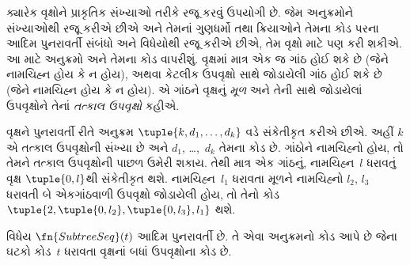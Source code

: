 \documentclass[../../../include/open-logic-section]{subfiles}
\begin{document}

ક્યારેક વૃક્ષોને પ્રાકૃતિક સંખ્યાઓ તરીકે રજૂ કરવું ઉપયોગી છે. જેમ
અનુક્રમોને સંખ્યાઓથી રજૂ કરીએ છીએ અને તેમનાં ગુણધર્મો તથા ક્રિયાઓને
તેમના કોડ પરના આદિમ પુનરાવર્તી સંબંધો અને વિધેયોથી રજૂ કરીએ છીએ,
તેમ વૃક્ષો માટે પણ કરી શકીએ. આ માટે અનુક્રમો અને તેમના કોડ
વાપરીશું. વૃક્ષમાં માત્ર એક જ ગાંઠ હોઈ શકે છે (જેને નામચિહ્ન હોય
કે ન હોય), અથવા કેટલીક ઉપવૃક્ષો સાથે જોડાયેલી ગાંઠ હોઈ શકે છે
(જેને નામચિહ્ન હોય કે ન હોય). એ ગાંઠને વૃક્ષનું \emph{મૂળ} અને
તેની સાથે જોડાયેલાં ઉપવૃક્ષોને તેનાં \emph{તત્કાલ ઉપવૃક્ષો} કહીએ.

વૃક્ષને પુનરાવર્તી રીતે અનુક્રમ $\tuple{k, d_1, \dots, d_k}$ વડે
સંકેતીકૃત કરીએ છીએ. અહીં $k$ એ તત્કાલ ઉપવૃક્ષોની સંખ્યા છે અને
$d_1$, \dots,~$d_k$ તેમના કોડ છે. ગાંઠોને નામચિહ્નો હોય, તો
તેમને તત્કાલ ઉપવૃક્ષોની પાછળ ઉમેરી શકાય. તેથી માત્ર એક ગાંઠનું,
નામચિહ્ન~$l$ ધરાવતું વૃક્ષ $\tuple{0,l}$થી સંકેતીકૃત થશે.
નામચિહ્ન~$l_1$ ધરાવતા મૂળને નામચિહ્નો $l_2$, $l_3$ ધરાવતી બે
એકગાંઠવાળી ઉપવૃક્ષો જોડાયેલી હોય, તો તેનો કોડ
$\tuple{2,
  \tuple{0, l_2}, \tuple{0, l_3}, l_1}$ થશે.

\begin{prop}
  વિધેય $\fn{SubtreeSeq}(t)$ આદિમ પુનરાવર્તી છે. તે એવા
  અનુક્રમનો કોડ આપે છે જેના ઘટકો કોડ~$t$ ધરાવતા વૃક્ષનાં બધાં
  ઉપવૃક્ષોના કોડ છે.
\end{prop}
\end{document}

